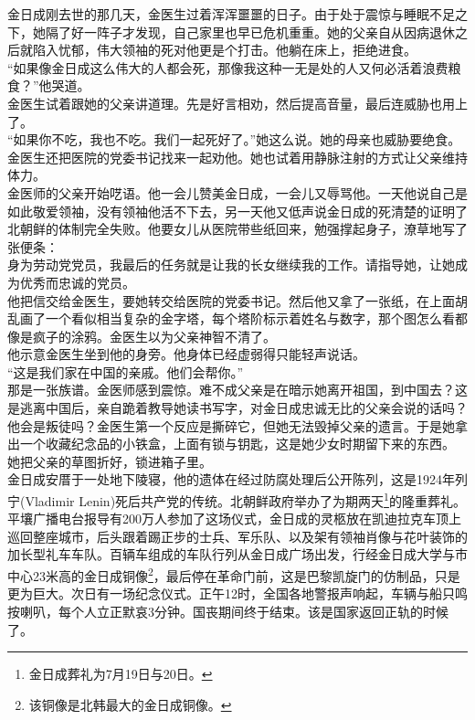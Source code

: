 \begin{multicols}{\theparacolNo}
金日成刚去世的那几天，金医生过着浑浑噩噩的日子。由于处于震惊与睡眠不足之下，她隔了好一阵子才发现，自己家里也早已危机重重。她的父亲自从因病退休之后就陷入忧郁，伟大领袖的死对他更是个打击。他躺在床上，拒绝进食。\\

“如果像金日成这么伟大的人都会死，那像我这种一无是处的人又何必活着浪费粮食？”他哭道。\\

金医生试着跟她的父亲讲道理。先是好言相劝，然后提高音量，最后连威胁也用上了。\\

“如果你不吃，我也不吃。我们一起死好了。”她这么说。她的母亲也威胁要绝食。金医生还把医院的党委书记找来一起劝他。她也试着用静脉注射的方式让父亲维持体力。\\

金医师的父亲开始呓语。他一会儿赞美金日成，一会儿又辱骂他。一天他说自己是如此敬爱领袖，没有领袖他活不下去，另一天他又低声说金日成的死清楚的证明了北朝鲜的体制完全失败。他要女儿从医院带些纸回来，勉强撑起身子，潦草地写了张便条：\\

身为劳动党党员，我最后的任务就是让我的长女继续我的工作。请指导她，让她成为优秀而忠诚的党员。\\

他把信交给金医生，要她转交给医院的党委书记。然后他又拿了一张纸，在上面胡乱画了一个看似相当复杂的金字塔，每个塔阶标示着姓名与数字，那个图怎么看都像是疯子的涂鸦。金医生以为父亲神智不清了。\\

他示意金医生坐到他的身旁。他身体已经虚弱得只能轻声说话。\\

“这是我们家在中国的亲戚。他们会帮你。”\\

那是一张族谱。金医师感到震惊。难不成父亲是在暗示她离开祖国，到中国去？这是逃离中国后，亲自跪着教导她读书写字，对金日成忠诚无比的父亲会说的话吗？他会是叛徒吗？金医生第一个反应是撕碎它，但她无法毁掉父亲的遗言。于是她拿出一个收藏纪念品的小铁盒，上面有锁与钥匙，这是她少女时期留下来的东西。\\

她把父亲的草图折好，锁进箱子里。\\

金日成安厝于一处地下陵寝，他的遗体在经过防腐处理后公开陈列，这是1924年列宁(Vladimir Lenin)死后共产党的传统。北朝鲜政府举办了为期两天\footnote{金日成葬礼为7月19日与20日。}的隆重葬礼。平壤广播电台报导有200万人参加了这场仪式，金日成的灵柩放在凯迪拉克车顶上巡回整座城市，后头跟着踢正步的士兵、军乐队、以及架有领袖肖像与花叶装饰的加长型礼车车队。百辆车组成的车队行列从金日成广场出发，行经金日成大学与市中心23米高的金日成铜像\footnote{该铜像是北韩最大的金日成铜像。}，最后停在革命门前，这是巴黎凯旋门的仿制品，只是更为巨大。次日有一场纪念仪式。正午12时，全国各地警报声响起，车辆与船只鸣按喇叭，每个人立正默哀3分钟。国丧期间终于结束。该是国家返回正轨的时候了。\\


\end{multicols}
